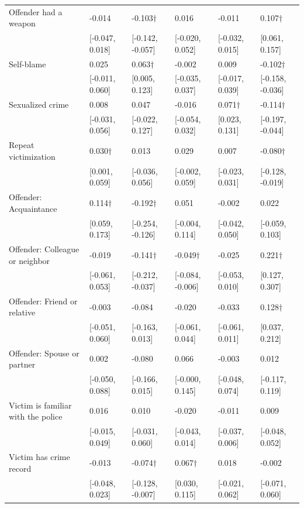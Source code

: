 \begin{tabular}[t]{llllll}
Offender had a weapon & -0.014 & -0.103$\dagger$ & 0.016 & -0.011 & 0.107$\dagger$\\
 & {}[-0.047, 0.018] & {}[-0.142, -0.057] & {}[-0.020, 0.052] & {}[-0.032, 0.015] & {}[0.061, 0.157]\\
Self-blame & 0.025 & 0.063$\dagger$ & -0.002 & 0.009 & -0.102$\dagger$\\
 & {}[-0.011, 0.060] & {}[0.005, 0.123] & {}[-0.035, 0.037] & {}[-0.017, 0.039] & {}[-0.158, -0.036]\\
Sexualized crime & 0.008 & 0.047 & -0.016 & 0.071$\dagger$ & -0.114$\dagger$\\
 & {}[-0.031, 0.056] & {}[-0.022, 0.127] & {}[-0.054, 0.032] & {}[0.023, 0.131] & {}[-0.197, -0.044]\\
Repeat victimization & 0.030$\dagger$ & 0.013 & 0.029 & 0.007 & -0.080$\dagger$\\
 & {}[0.001, 0.059] & {}[-0.036, 0.056] & {}[-0.002, 0.059] & {}[-0.023, 0.031] & {}[-0.128, -0.019]\\
Offender: Acquaintance & 0.114$\dagger$ & -0.192$\dagger$ & 0.051 & -0.002 & 0.022\\
 & {}[0.059, 0.173] & {}[-0.254, -0.126] & {}[-0.004, 0.114] & {}[-0.042, 0.050] & {}[-0.059, 0.103]\\
Offender: Colleague or neighbor & -0.019 & -0.141$\dagger$ & -0.049$\dagger$ & -0.025 & 0.221$\dagger$\\
 & {}[-0.061, 0.053] & {}[-0.212, -0.037] & {}[-0.084, -0.006] & {}[-0.053, 0.010] & {}[0.127, 0.307]\\
Offender: Friend or relative & -0.003 & -0.084 & -0.020 & -0.033 & 0.128$\dagger$\\
 & {}[-0.051, 0.060] & {}[-0.163, 0.013] & {}[-0.061, 0.044] & {}[-0.061, 0.011] & {}[0.037, 0.212]\\
Offender: Spouse or partner & 0.002 & -0.080 & 0.066 & -0.003 & 0.012\\
 & {}[-0.050, 0.088] & {}[-0.166, 0.015] & {}[-0.000, 0.145] & {}[-0.048, 0.074] & {}[-0.117, 0.119]\\
Victim is familiar with the police & 0.016 & 0.010 & -0.020 & -0.011 & 0.009\\
 & {}[-0.015, 0.049] & {}[-0.031, 0.060] & {}[-0.043, 0.014] & {}[-0.037, 0.006] & {}[-0.048, 0.052]\\
Victim has crime record & -0.013 & -0.074$\dagger$ & 0.067$\dagger$ & 0.018 & -0.002\\
 & {}[-0.048, 0.023] & {}[-0.128, -0.007] & {}[0.030, 0.115] & {}[-0.021, 0.062] & {}[-0.071, 0.060]\\

\end{tabular}
